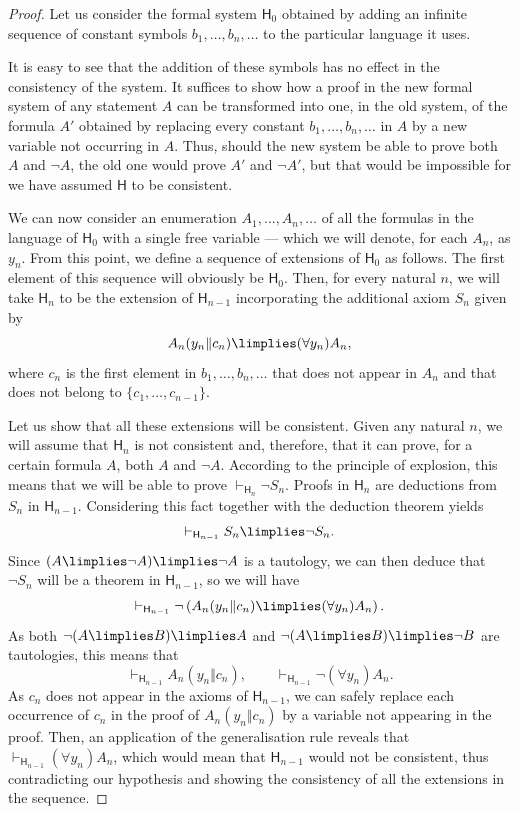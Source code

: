 \begin{proof}
Let us consider the formal system $\mathsf{H}_0$ obtained by adding an infinite sequence of constant symbols $b_1,\ldots,b_n,\ldots$ to the particular language it uses.

It is easy to see that the addition of these symbols has no effect in the consistency of the system.
It suffices to show how a proof in the new formal system of any statement $A$ can be transformed into one, in the old system, of the formula $A'$ obtained by replacing every constant $b_1,\ldots,b_n,\ldots$ in $A$ by a new variable not occurring in $A$.
Thus, should the new system be able to prove both $A$ and $\lnot A$, the old one would prove $A'$ and $\lnot A'$, but that would be impossible for we have assumed $\mathsf{H}$ to be consistent.

We can now consider an enumeration $A_1,\ldots,A_n,\ldots$ of all the formulas in the language of $\mathsf{H}_0$ with a single free variable --- which we will denote, for each $A_n$, as $y_n$. 
From this point, we define a sequence of extensions of $\mathsf{H}_0$ as follows.
The first element of this sequence will obviously be $\mathsf{H}_0$.
Then, for every natural $n$, we will take $\mathsf{H}_n$ to be the extension of $\mathsf{H}_{n-1}$ incorporating the additional axiom $S_n$ given by
\[ A_n(y_n\Vert c_n) \limplies (\forall y_n) A_n,\]
where $c_n$ is the first element in $b_1,\ldots,b_n,\ldots$ that does not appear in $A_n$ and that does not belong to $\{c_1,\ldots,c_{n-1}\}$. 

Let us show that all these extensions will be consistent. Given any natural $n$, we will assume that $\mathsf{H}_n$ is not consistent and, therefore, that it can prove, for a certain formula $A$, both $A$ and $\lnot A$.
According to the principle of explosion, this means that we will be able to prove $\vdash_{\mathsf{H}_n} \lnot S_n$. Proofs in $\mathsf{H}_n$ are deductions from $S_n$ in $\mathsf{H}_{n-1}$. Considering this fact together with the deduction theorem yields
\[ \vdash_{\mathsf{H}_{n-1}} S_n \limplies \lnot S_n.\]
Since $(A \limplies \lnot A) \limplies \lnot A$ is a tautology, we can then deduce that $\lnot S_n$ will be a theorem in $\mathsf{H}_{n-1}$, so we will have
\[ \vdash_{\mathsf{H}_{n-1}} \lnot \left( A_n(y_n\Vert c_n) \limplies (\forall y_n) A_n \right).\]
As both $\lnot(A\limplies B) \limplies A$ and $\lnot(A \limplies B) \limplies \lnot B$ are tautologies, this means that
\[ \vdash_{\mathsf{H}_{n-1}} A_n(y_n\Vert c_n),\qquad
\vdash_{\mathsf{H}_{n-1}} \lnot (\forall y_n) A_n.\]
As $c_n$ does not appear in the axioms of $\mathsf{H}_{n-1}$, we can safely replace each occurrence of $c_n$ in the proof of $A_n(y_n\Vert c_n)$ by a variable not appearing in the proof.
Then, an application of the generalisation rule reveals that $\vdash_{\mathsf{H}_{n-1}} (\forall y_n) A_n$, which would mean that $\mathsf{H}_{n-1}$ would not be consistent, thus contradicting our hypothesis and showing the consistency of all the extensions in the sequence.


\end{proof}

